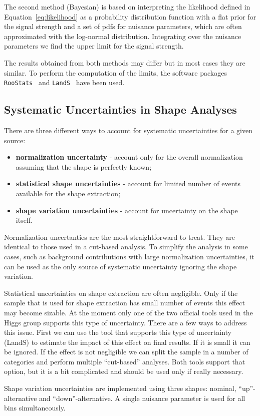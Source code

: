 The second method (Bayesian) is based on interpreting the likelihood
defined in Equation~\ref{eq:likelihood} as a probability distribution
function with a flat prior for the signal strength and a set of pdfs
for nuisance parameters, which are often approximated with the
log-normal distribution. Integrating over the nuisance parameters we
find the upper limit for the signal strength.

The results obtained from both methods may differ but in most cases
they are similar. To perform the computation of the limits, the
software packages
\texttt{RooStats}~\cite{rootstat} and \texttt{LandS}~\cite{lands} have 
been used.

\subsection{Systematic Uncertainties in Shape Analyses} 

There are three different ways to account for systematic uncertainties for a 
given source:
\begin{itemize}
  \item {\bf normalization uncertainty} - account only for the overall
    normalization assuming that the shape is perfectly known;
  \item {\bf statistical shape uncertainties} - account for limited
    number of events available for the shape extraction;
  \item {\bf shape variation uncertainties} - account for uncertainty
    on the shape itself.
\end{itemize}

Normalization uncertanties are the most straightforward to treat. They
are identical to those used in a cut-based analysis. To simplify the
analysis in some cases, such as background contributions with
large normalization uncertainties, it can be used as the only source of
systematic uncertainty ignoring the shape variation.

Statistical uncertainties on shape extraction are often
negligible. Only if the sample that is used for shape extraction has
small number of events this effect may become sizable. At the moment
only one of the two official tools used in the Higgs group supports
this type of uncertainty. There are a few ways to address this
issue. First we can use the tool that supports this type of
uncertainty (LandS) to estimate the impact of this effect on final
results. If it is small it can be ignored. If the effect is not
negligible we can split the sample in a number of categories and
perform multiple ``cut-based'' analyses. Both tools support that
option, but it is a bit complicated and should be used only if really
necessary.

Shape variation uncertainties are implemented using three shapes:
nominal, ``up''-alternative and ``down''-alternative. A single
nuisance parameter is used for all bins simultaneously.
